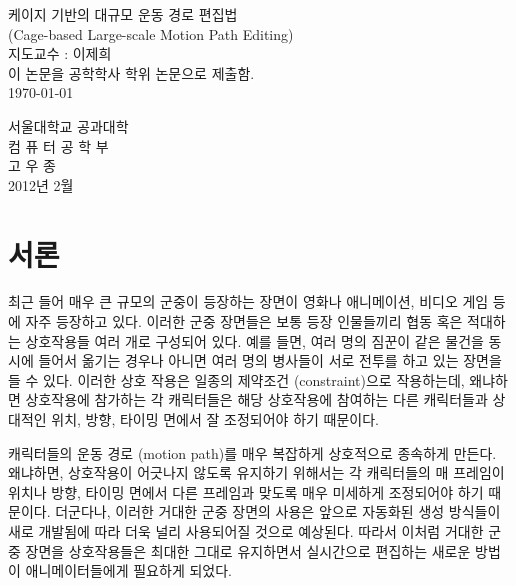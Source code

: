 \documentclass[12pt,a4paper,oneside,final]{report}
\title{\thesistitle{}}
\author{고우종\\
서울대학교 컴퓨터공학부\\
\href{mailto:wjngkoh@gmail.com}{\texttt{wjngkoh@gmail.com}}
}
\date{\today}
\newcommand{\thesistitle}{케이지 기반의 대규모 운동 경로 편집법\\ (Cage-based Large-scale Motion Path Editing)}
\begin{document}
\begin{titlepage}
\begin{center}
{\LARGE \thesistitle{}}\\[4.0cm]

{\Large 지도교수 : 이제희}\\[1.5cm]

{\Large 이 논문을 공학학사 학위 논문으로 제출함.}\\[2.5cm]

{\Large \today}\\[1.5cm]
\vfill

\Large
서울대학교 공과대학\\
컴 퓨 터 공 학 부\\
고 우 종\\[1.0cm]
{\Large 2012년 2월}
\end{center}
\end{titlepage}

\maketitle

\begin{abstract}
Your abstract goes here...
\end{abstract}

\tableofcontents

\chapter{서론}
최근 들어 매우 큰 규모의 군중이 등장하는 장면이 영화나 애니메이션, 비디오 게임
등에 자주 등장하고 있다. 이러한 군중 장면들은 보통 등장 인물들끼리 협동 혹은
적대하는 상호작용들 여러 개로 구성되어 있다. 예를 들면, 여러 명의 짐꾼이 같은
물건을 동시에 들어서 옮기는 경우나 아니면 여러 명의 병사들이 서로 전투를 하고
있는 장면을 들 수 있다. 이러한 상호 작용은 일종의 제약조건 (constraint)으로
작용하는데, 왜냐하면 상호작용에 참가하는 각 캐릭터들은 해당 상호작용에 참여하는
다른 캐릭터들과 상대적인 위치, 방향, 타이밍 면에서 잘 조정되어야 하기 때문이다.


캐릭터들의 운동 경로 (motion path)를 매우 복잡하게 상호적으로 종속하게 만든다.
왜냐하면, 상호작용이 어긋나지 않도록 유지하기 위해서는 각 캐릭터들의 매
프레임이 위치나 방향, 타이밍 면에서 다른 프레임과 맞도록 매우 미세하게
조정되어야 하기 때문이다.  더군다나, 이러한 거대한 군중 장면의 사용은 앞으로
자동화된 생성 방식들이 새로 개발됨에 따라 더욱 널리 사용되어질 것으로 예상된다.
따라서 이처럼 거대한 군중 장면을 상호작용들은 최대한 그대로 유지하면서
실시간으로 편집하는 새로운 방법이 애니메이터들에게 필요하게 되었다.
\end{document}
